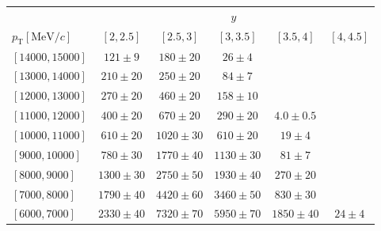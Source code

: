 \renewcommand{\arraystretch}{1.0}
\begin{tabular}{lr@{\hskip+0.2em}c@{\hskip+0.2em}r@{\hskip+0.2em}c@{\hskip+0.2em}rr@{\hskip+0.2em}c@{\hskip+0.2em}r@{\hskip+0.2em}c@{\hskip+0.2em}rr@{\hskip+0.2em}c@{\hskip+0.2em}r@{\hskip+0.2em}c@{\hskip+0.2em}rr@{\hskip+0.2em}c@{\hskip+0.2em}r@{\hskip+0.2em}c@{\hskip+0.2em}rr@{\hskip+0.2em}c@{\hskip+0.2em}r@{\hskip+0.2em}c@{\hskip+0.2em}r}
\toprule&\multicolumn{25}{c}{$y$}\\
$p_{\text{T}} [\text{MeV}/c]$ & \multicolumn{5}{c}{$[2,2.5]$} & \multicolumn{5}{c}{$[2.5,3]$} & \multicolumn{5}{c}{$[3,3.5]$} & \multicolumn{5}{c}{$[3.5,4]$} & \multicolumn{5}{c}{$[4,4.5]$} \\
\midrule$[14000,15000]$ & \multicolumn{5}{c}{$121 \pm 9$} & \multicolumn{5}{c}{$180 \pm 20$} & \multicolumn{5}{c}{$26 \pm 4$} & \multicolumn{5}{c}{ } & \multicolumn{5}{c}{ } \\
$[13000,14000]$ & \multicolumn{5}{c}{$210 \pm 20$} & \multicolumn{5}{c}{$250 \pm 20$} & \multicolumn{5}{c}{$84 \pm 7$} & \multicolumn{5}{c}{ } & \multicolumn{5}{c}{ } \\
$[12000,13000]$ & \multicolumn{5}{c}{$270 \pm 20$} & \multicolumn{5}{c}{$460 \pm 20$} & \multicolumn{5}{c}{$158 \pm 10$} & \multicolumn{5}{c}{ } & \multicolumn{5}{c}{ } \\
$[11000,12000]$ & \multicolumn{5}{c}{$400 \pm 20$} & \multicolumn{5}{c}{$670 \pm 20$} & \multicolumn{5}{c}{$290 \pm 20$} & \multicolumn{5}{c}{$4.0 \pm 0.5$} & \multicolumn{5}{c}{ } \\
$[10000,11000]$ & \multicolumn{5}{c}{$610 \pm 20$} & \multicolumn{5}{c}{$1020 \pm 30$} & \multicolumn{5}{c}{$610 \pm 20$} & \multicolumn{5}{c}{$19 \pm 4$} & \multicolumn{5}{c}{ } \\
$[9000,10000]$ & \multicolumn{5}{c}{$780 \pm 30$} & \multicolumn{5}{c}{$1770 \pm 40$} & \multicolumn{5}{c}{$1130 \pm 30$} & \multicolumn{5}{c}{$81 \pm 7$} & \multicolumn{5}{c}{ } \\
$[8000,9000]$ & \multicolumn{5}{c}{$1300 \pm 30$} & \multicolumn{5}{c}{$2750 \pm 50$} & \multicolumn{5}{c}{$1930 \pm 40$} & \multicolumn{5}{c}{$270 \pm 20$} & \multicolumn{5}{c}{ } \\
$[7000,8000]$ & \multicolumn{5}{c}{$1790 \pm 40$} & \multicolumn{5}{c}{$4420 \pm 60$} & \multicolumn{5}{c}{$3460 \pm 50$} & \multicolumn{5}{c}{$830 \pm 30$} & \multicolumn{5}{c}{ } \\
$[6000,7000]$ & \multicolumn{5}{c}{$2330 \pm 40$} & \multicolumn{5}{c}{$7320 \pm 70$} & \multicolumn{5}{c}{$5950 \pm 70$} & \multicolumn{5}{c}{$1850 \pm 40$} & \multicolumn{5}{c}{$24 \pm 4$} \\

\end{tabular}
